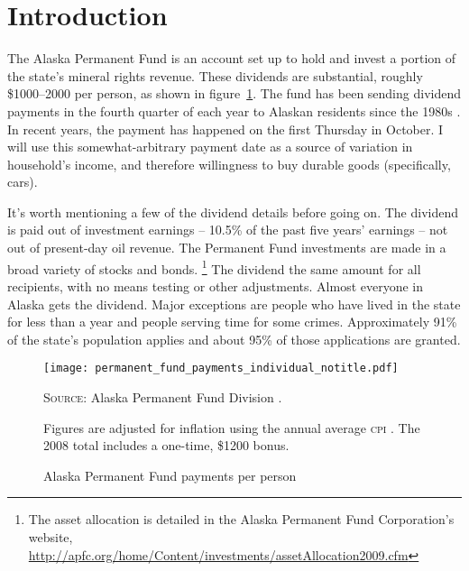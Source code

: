 \documentclass[11pt,letterpaper,oneside]{article}
\begin{document}
\pagebreak
\section{Introduction}


The Alaska Permanent Fund is an account set up to hold and invest a portion of the state's mineral rights revenue.
These dividends are substantial, roughly \$1000--2000 per person, as shown in figure~\ref{fig:permanent-fund-payments-individual}.
The fund has been sending dividend payments in the fourth quarter of each year to Alaskan residents since the 1980s \parencite{hsieh2003}.
In recent years, the payment has happened on the first Thursday in October.
I will use this somewhat-arbitrary payment date as a source of variation in household's income, and therefore willingness to buy durable goods (specifically, cars).




It's worth mentioning a few of the dividend details before going on.
The dividend is paid out of investment earnings -- 10.5\% of the past five years' earnings -- not out of present-day oil revenue.
The Permanent Fund investments are made in a broad variety of stocks and bonds.%
\footnote{The asset allocation is detailed in the Alaska Permanent Fund Corporation's website, \url{http://apfc.org/home/Content/investments/assetAllocation2009.cfm}}
The dividend the same amount for all recipients, with no means testing or other adjustments.
Almost everyone in Alaska gets the dividend.
Major exceptions are people who have lived in the state for less than a year and people serving time for some crimes.
Approximately 91\% of the state's population applies and about 95\% of those applications are granted.

\begin{figure}[bht]
    \caption{\large Alaska Permanent Fund payments per person}
    \vspace{-1.05em}
    \texttt{[image: permanent\_fund\_payments\_individual\_notitle.pdf]}
    \label{fig:permanent-fund-payments-individual}

    \textsc{Source:} Alaska Permanent Fund Division \parencite{apfd_payments_summary}.\par
		Figures are adjusted for inflation using the annual average \textsc{cpi} \parencite{fred_inflation}.
		The 2008 total includes a one-time, \$1200 bonus.
\end{figure}
\end{document}
